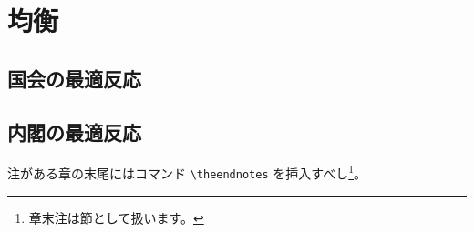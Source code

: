 \documentclass[main.tex]{subfiles}
\begin{document}
\section{均衡}


\subsection{国会の最適反応}



\subsection{内閣の最適反応}



\theendnotes %

注がある章の末尾にはコマンド \verb#\theendnotes# を挿入すべし\footnote{章末注は節として扱います。}。


\theendnotes %
\end{document}

